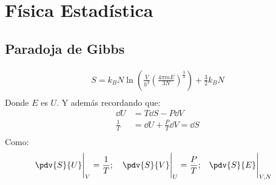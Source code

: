 \documentclass[../main]{subfiles}
\begin{document}
\chapter{Física Estadística}

\section{Paradoja de Gibbs}

\begin{align}
    S=k_B N \ln{\left(\frac{V}{h^3} \left(\frac{4\pi m E}{3N}\right)^{\frac{3}{2}}\right)} + \frac{3}{2} k_B N \\
\end{align}
Donde $E$ es $U$. Y además recordando que:
\begin{align}
    \dd U       & = T\dd S - P\dd V                   \\
    \frac{1}{T} & = \dd U + \frac{P}{T} \dd V = \dd S \\
\end{align}
Como:
\begin{align}
    \pdv{S}{U} \Bigg\rvert_V = \frac{1}{T}; \quad
    \pdv{S}{V} \Bigg\rvert_U =\frac{P}{T}; \quad
     & \pdv{S}{E} \Bigg\rvert_{V, N}
\end{align}
\end{document}
